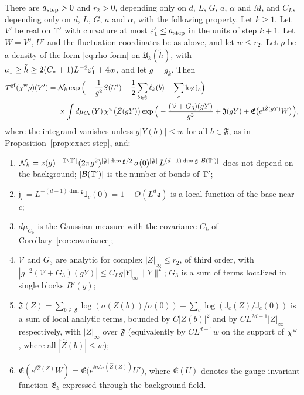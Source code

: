 \begin{theorem}\label{thm:step}
There are $a_{\rm step}>0$ and $r_2>0$, depending only on $d$, $L$, $G$, $a$, $\alpha$ and $M$, and $C_L$, depending only on $d$, $L$, $G$, $a$ and $\alpha$, with the following property. Let $k\ge1$. Let $V'$ be real on $\mathbb T'$ with curvature at most $\varepsilon'_1\le a_{\rm step}$ in the units of step $k+1$. Let $W=V^0$, $U'$ and the fluctuation coordinates be as above, and let $w\le r_2$. Let $\rho$ be a density of the form \eqref{eq:rho-form} on $\mathfrak U_k(\tilde h)$, with $a_1\ge\tilde h\ge2(C_*+1)L^{-2}\varepsilon'_1+4w$, and let $g=g_k$. Then
\[
\begin{aligned}
T^{\rm gf}(\chi^{\rm w}\rho)(V')={}&\mathcal N_k\exp\Big(-\frac1{g^2}S(U')-\frac12\sum_{b\in\mathfrak F}\ell_k(b)+\sum_c\log\mathfrak j_c\Big)\\
&\times\int d\mu_{C_k}(Y)\,\chi^{\rm w}\big(\hat Z(gY)\big)\exp\Big(-\frac{(\mathcal V+G_3)(gY)}{g^2}+\mathfrak J(gY)+\mathfrak E\big(e^{\mathrm i\hat Z(gY)}W\big)\Big),
\end{aligned}
\]
where the integrand vanishes unless $g|Y(b)|\le w$ for all $b\in\mathfrak F$, as in Proposition~\ref{prop:exact-step}, and:
\begin{enumerate}[label=(\alph*)]
\item $\mathcal N_k=z(g)^{-|\mathbb T\setminus\mathbb T'|}(2\pi g^2)^{|\mathfrak F|\dim\mathfrak g/2}\,\sigma(0)^{|\mathfrak F|}\,L^{(d-1)\dim\mathfrak g\,|\mathcal B(\mathbb T')|}$ does not depend on the background; $|\mathcal B(\mathbb T')|$ is the number of bonds of $\mathbb T'$;
\item $\mathfrak j_c=L^{-(d-1)\dim\mathfrak g}\mathsf J_c(0)=1+O(L^d\mathsf a)$ is a local function of the base near $c$;
\item $d\mu_{C_k}$ is the Gaussian measure with the covariance $C_k$ of Corollary~\ref{cor:covariance};
\item $\mathcal V$ and $G_3$ are analytic for complex $|Z|_\infty\le r_2$, of third order, with $|g^{-2}(\mathcal V+G_3)(gY)|\le C_Lg|Y|_\infty\|Y\|^2$; $G_3$ is a sum of terms localized in single blocks $B'(y)$;
\item $\mathfrak J(Z)=\sum_{b\in\mathfrak F}\log(\sigma(Z(b))/\sigma(0))+\sum_c\log(\mathsf J_c(Z)/\mathsf J_c(0))$ is a sum of local analytic terms, bounded by $C|Z(b)|^2$ and by $CL^{2d+1}|Z|_\infty$ respectively, with $|Z|_\infty$ over $\mathfrak F$ (equivalently by $CL^{d+1}w$ on the support of $\chi^{\rm w}$, where all $|\hat Z(b)|\le w$);
\item $\mathfrak E(e^{\ii\hat Z(Z)}W)=\mathfrak E\big(e^{\ii\eta A_*(\hat Z(Z))}U'\big)$, where $\mathfrak E(U)$ denotes the gauge-invariant function $\mathfrak E_k$ expressed through the background field.

\end{enumerate}
\end{theorem}
